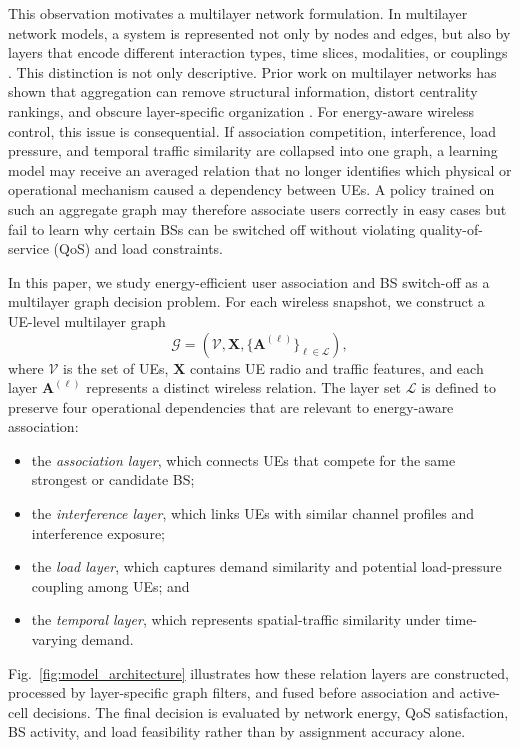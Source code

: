 \documentclass[journal]{IEEEtran}
\begin{document}
This observation motivates a multilayer network formulation. In multilayer
network models, a system is represented not only by nodes and edges, but also
by layers that encode different interaction types, time slices, modalities, or
couplings \cite{kivela2014multilayer,dedomenico2013mathematical,boccaletti2014structure}.
This distinction is not only descriptive. Prior work on multilayer networks has
shown that aggregation can remove structural information, distort centrality
rankings, and obscure layer-specific organization
\cite{dedomenico2015reducibility,dedomenico2015versatile}. For energy-aware
wireless control, this issue is consequential. If association competition,
interference, load pressure, and temporal traffic similarity are collapsed into
one graph, a learning model may receive an averaged relation that no longer
identifies which physical or operational mechanism caused a dependency between
UEs. A policy trained on such an aggregate graph may therefore associate users
correctly in easy cases but fail to learn why certain BSs can be switched off
without violating quality-of-service (QoS) and load constraints.

In this paper, we study energy-efficient user association and BS switch-off as
a multilayer graph decision problem. For each wireless snapshot, we construct a
UE-level multilayer graph
\begin{equation}
    \mathcal{G} = \left(\mathcal{V}, \mathbf{X},
    \{\mathbf{A}^{(\ell)}\}_{\ell \in \mathcal{L}}\right),
\end{equation}
where $\mathcal{V}$ is the set of UEs, $\mathbf{X}$ contains UE radio and
traffic features, and each layer $\mathbf{A}^{(\ell)}$ represents a distinct
wireless relation. The layer set $\mathcal{L}$ is defined to preserve four
operational dependencies that are relevant to energy-aware association:
\begin{itemize}
    \item the \emph{association layer}, which connects UEs that compete for
    the same strongest or candidate BS;
    \item the \emph{interference layer}, which links UEs with similar channel
    profiles and interference exposure;
    \item the \emph{load layer}, which captures demand similarity and
    potential load-pressure coupling among UEs; and
    \item the \emph{temporal layer}, which represents spatial-traffic
    similarity under time-varying demand.
\end{itemize}
Fig.~\ref{fig:model_architecture} illustrates how these relation layers are
constructed, processed by layer-specific graph filters, and fused before
association and active-cell decisions. The final decision is evaluated by
network energy, QoS satisfaction, BS activity, and load feasibility rather than
by assignment accuracy alone.
\end{document}
